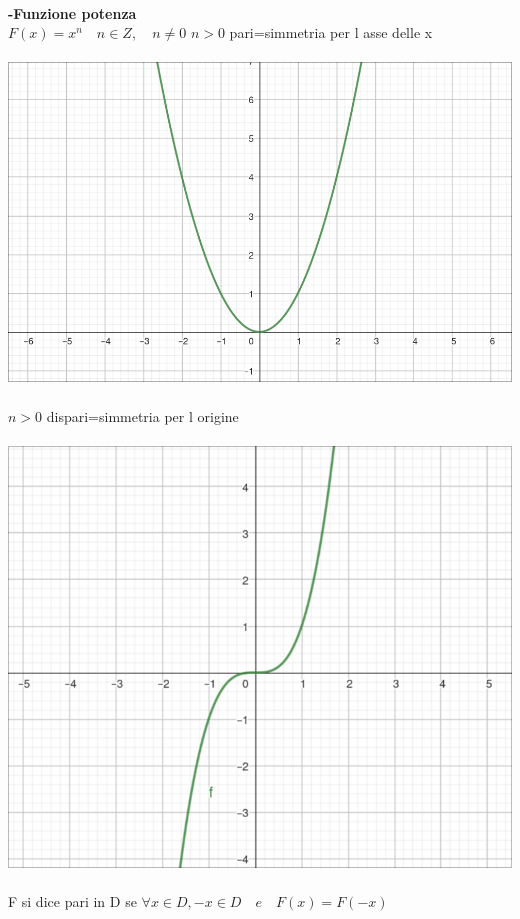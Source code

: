 \documentclass{article}
\begin{document}
\\
\textbf{-Funzione potenza}
\\
$F(x)=x^n \quad n \in Z , \quad n \neq 0$
$n>0$ pari=simmetria per l asse delle x\\
\\
\includegraphics{./immagini/funzione-potenza-pari.png}
\\
\\
$n>0$ dispari=simmetria per l origine\\
\\
\includegraphics{./immagini/funzione-potenza-dispari.png}
\\
\\
F si dice pari in D se $\forall x \in D, -x \in D\quad e \quad F(x)=F(-x)$\\
\end{document}
